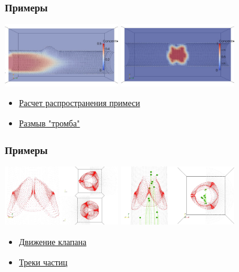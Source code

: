 \documentclass[14pt]{beamer}
\begin{document}
\begin{frame}
\frametitle{Примеры}
    \begin{center}
        \includegraphics[width=5cm]{source_in_vessel_avi.png}
        \vspace{0.40mm}
        \includegraphics[width=5cm]{thrombus_in_vessel_avi.png}
    \end{center}

\begin{itemize}
    \item[\MVRightarrow] \href{run:video/source_in_vessel.avi}{Расчет распространения примеси}
    \item[\MVRightarrow] \href{run:video/thrombus_in_vessel.avi}{Размыв "тромба"}
\end{itemize}
\end{frame}

\begin{frame}
\frametitle{Примеры}
    \begin{center}
        \includegraphics[width=5cm]{valves_closing_accurate_two_avi.png}
        \vspace{0.40mm}
        \includegraphics[width=5cm]{valves_flow_avi.png}
    \end{center}

\begin{itemize}
    \item[\MVRightarrow] \href{run:video/valves_closing_accurate_two.avi}{Движение клапана}
    \item[\MVRightarrow] \href{run:video/valves_flow.avi}{Треки частиц}
\end{itemize}
\end{frame}
\end{document}
